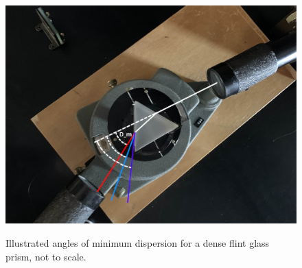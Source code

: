 \documentclass[10pt, twocolumn]{article}
\theoremstyle{definition}
\begin{document}
\begin{figure}[h]
  \centering%
  \caption{Illustrated angles of minimum dispersion for a dense flint glass prism, not to scale.}
  \includegraphics[scale=0.55]{Prism Above.jpg}
  \label{pris}
\end{figure}
\end{document}

